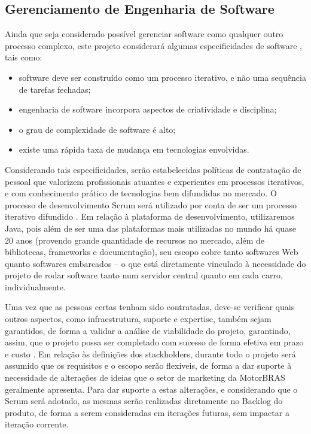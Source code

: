 \documentclass[12pt,journal,compsoc]{IEEEtran}
\begin{document}
\subsection{Gerenciamento de Engenharia de Software}

Ainda que seja considerado possível gerenciar software como qualquer outro processo complexo, este projeto considerará algumas especificidades de software \cite{society_software_2004}, tais como: 

\begin{itemize}
\item software deve ser construído como um processo iterativo, e não uma sequência de tarefas fechadas;
\item engenharia de software incorpora aspectos de criatividade e disciplina;
\item o grau de complexidade de software é alto;
\item existe uma rápida taxa de mudança em tecnologias envolvidas. 
\end{itemize}

Considerando tais especificidades, serão estabelecidas políticas de contratação de pessoal que valorizem profissionais atuantes e experientes em processos iterativos, e com conhecimento prático de tecnologias bem difundidas no mercado. O processo de desenvolvimento Scrum será utilizado por conta de ser um processo iterativo difundido \cite{scrum_development_process}. Em relação à plataforma de desenvolvimento, utilizaremos Java, pois além de ser uma das plataformas mais utilizadas no mundo há quase 20 anos \cite{tiobe_language} (provendo grande quantidade de recursos no mercado, além de bibliotecas, frameworks e documentação), seu escopo cobre tanto softwares Web quanto softwares embarcados -- o que está diretamente vinculado à necessidade do projeto de rodar software tanto num servidor central quanto em cada carro, individualmente.

Uma vez que as pessoas certas tenham sido contratadas, deve-se verificar quais outros aspectos, como infraestrutura, suporte e expertise, também sejam  garantidos, de forma a validar a análise de viabilidade do projeto, garantindo, assim, que o projeto possa ser completado com sucesso de forma efetiva em prazo e custo \cite{society_software_2004}. Em relação às definições dos stackholders, durante todo o projeto será assumido que os requisitos e o escopo serão flexíveis, de forma a dar suporte à necessidade de alterações de ideias que o setor de marketing da MotorBRAS geralmente apresenta. Para dar suporte a estas alterações, e considerando que o Scrum será adotado, as mesmas serão realizadas diretamente no Backlog do produto, de forma a serem consideradas em iterações futuras, sem impactar a iteração corrente. \cite{schwaber_scrum_2013}
\end{document}
